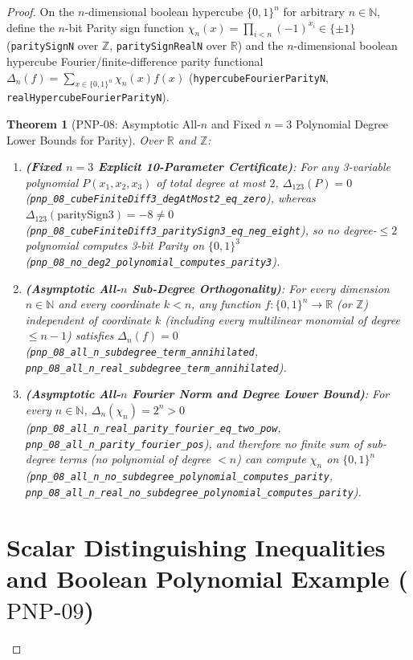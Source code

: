 \documentclass[11pt,a4paper]{article}
\theoremstyle{plain}
\newtheorem{theorem}{Theorem}[section]
\theoremstyle{definition}
\theoremstyle{remark}
\newcommand{\R}{\mathbb{R}}
\newcommand{\Z}{\mathbb{Z}}
\newcommand{\N}{\mathbb{N}}
\begin{document}
\begin{proof}
On the $n$-dimensional boolean hypercube $\{0, 1\}^n$ for arbitrary $n \in \N$, define the $n$-bit Parity sign function $\chi_n(x) = \prod_{i < n} (-1)^{x_i} \in \{\pm 1\}$ (\texttt{paritySignN} over $\Z$, \texttt{paritySignRealN} over $\R$) and the $n$-dimensional boolean hypercube Fourier/finite-difference parity functional $\Delta_n(f) = \sum_{x \in \{0,1\}^n} \chi_n(x) f(x)$ (\texttt{hypercubeFourierParityN}, \texttt{realHypercubeFourierParityN}).

\begin{theorem}[$\mathrm{PNP\text{-}08}$: Asymptotic All-$n$ and Fixed $n = 3$ Polynomial Degree Lower Bounds for Parity]\label{thm:pnp08}
Over $\R$ and $\Z$:
\begin{enumerate}
  \item \textbf{(Fixed $n = 3$ Explicit 10-Parameter Certificate)}: For any 3-variable polynomial $P(x_1, x_2, x_3)$ of total degree at most $2$, $\Delta_{123}(P) = 0$ (\texttt{pnp\_08\_cubeFiniteDiff3\_degAtMost2\_eq\_zero}), whereas $\Delta_{123}(\mathrm{paritySign3}) = -8 \ne 0$ (\texttt{pnp\_08\_cubeFiniteDiff3\_paritySign3\_eq\_neg\_eight}), so no degree-$\le 2$ polynomial computes 3-bit Parity on $\{0, 1\}^3$ (\texttt{pnp\_08\_no\_deg2\_polynomial\_computes\_parity3}).
  \item \textbf{(Asymptotic All-$n$ Sub-Degree Orthogonality)}: For every dimension $n \in \N$ and every coordinate $k < n$, any function $f : \{0, 1\}^n \to \R$ (or $\Z$) independent of coordinate $k$ (including every multilinear monomial of degree $\le n - 1$) satisfies $\Delta_n(f) = 0$ (\texttt{pnp\_08\_all\_n\_subdegree\_term\_annihilated}, \texttt{pnp\_08\_all\_n\_real\_subdegree\_term\_annihilated}).
  \item \textbf{(Asymptotic All-$n$ Fourier Norm and Degree Lower Bound)}: For every $n \in \N$, $\Delta_n(\chi_n) = 2^n > 0$ (\texttt{pnp\_08\_all\_n\_real\_parity\_fourier\_eq\_two\_pow}, \texttt{pnp\_08\_all\_n\_parity\_fourier\_pos}), and therefore no finite sum of sub-degree terms (no polynomial of degree $< n$) can compute $\chi_n$ on $\{0, 1\}^n$ (\texttt{pnp\_08\_all\_n\_no\_subdegree\_polynomial\_computes\_parity}, \texttt{pnp\_08\_all\_n\_real\_no\_subdegree\_polynomial\_computes\_parity}).
\end{enumerate}
\end{theorem}

\section{Scalar Distinguishing Inequalities and Boolean Polynomial Example (\texorpdfstring{$\mathrm{PNP\text{-}09}$}{PNP-09})}


\end{proof}
\end{document}
